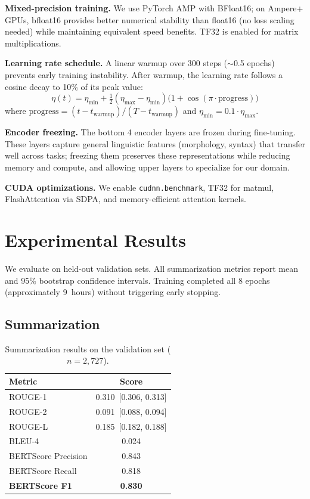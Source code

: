 \documentclass[11pt,a4paper]{article}
\begin{document}
\textbf{Mixed-precision training.}
We use PyTorch AMP with BFloat16; on Ampere+ GPUs, bfloat16 provides better numerical stability than float16 (no loss scaling needed) while maintaining equivalent speed benefits.
TF32 is enabled for matrix multiplications.

\textbf{Learning rate schedule.}
A linear warmup over 300 steps ($\sim$0.5 epochs) prevents early training instability.
After warmup, the learning rate follows a cosine decay to 10\% of its peak value:
\begin{equation}
    \eta(t) = \eta_\text{min} + \tfrac{1}{2}(\eta_\text{max} - \eta_\text{min})\bigl(1 + \cos(\pi \cdot \text{progress})\bigr)
\end{equation}
where $\text{progress} = (t - t_\text{warmup}) / (T - t_\text{warmup})$ and $\eta_\text{min} = 0.1 \cdot \eta_\text{max}$.

\textbf{Encoder freezing.}
The bottom 4 encoder layers are frozen during fine-tuning.
These layers capture general linguistic features (morphology, syntax) that transfer well across tasks; freezing them preserves these representations while reducing memory and compute, and allowing upper layers to specialize for our domain.

\textbf{CUDA optimizations.}
We enable \texttt{cudnn.benchmark}, TF32 for matmul, FlashAttention via SDPA, and memory-efficient attention kernels.

\section{Experimental Results}
\label{sec:results}

We evaluate on held-out validation sets.
All summarization metrics report mean and 95\% bootstrap confidence intervals.
Training completed all 8 epochs (approximately 9~hours) without triggering early stopping.

\subsection{Summarization}

\begin{table}[t]
\centering
\caption{Summarization results on the validation set ($n = 2{,}727$).}
\label{tab:summ_results}
\begin{tabular}{lc}
\toprule
\textbf{Metric} & \textbf{Score} \\
\midrule
ROUGE-1 & 0.310~{\scriptsize[0.306, 0.313]} \\
ROUGE-2 & 0.091~{\scriptsize[0.088, 0.094]} \\
ROUGE-L & 0.185~{\scriptsize[0.182, 0.188]} \\
BLEU-4 & 0.024 \\
\midrule
BERTScore Precision & 0.843 \\
BERTScore Recall & 0.818 \\
\textbf{BERTScore F1} & \textbf{0.830} \\
\bottomrule
\end{tabular}
\end{table}
\end{document}
